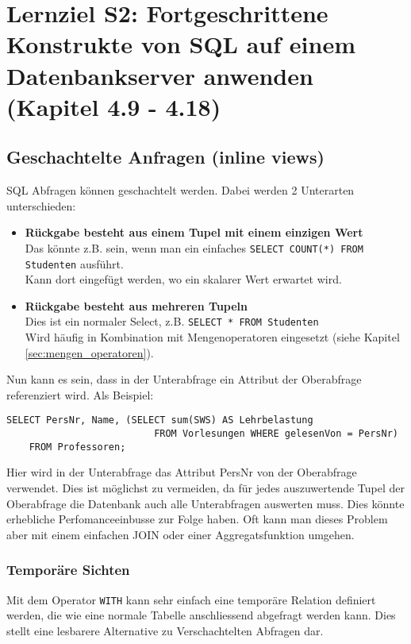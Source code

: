 \section{Lernziel S2: Fortgeschrittene Konstrukte von SQL auf einem Datenbankserver anwenden (Kapitel 4.9 - 4.18)}

\subsection{Geschachtelte Anfragen (inline views)}

SQL Abfragen können geschachtelt werden. Dabei werden 2 Unterarten unterschieden:

\begin{itemize}
  \item \textbf{Rückgabe besteht aus einem Tupel mit einem einzigen Wert} \\
  Das könnte z.B. sein, wenn man ein einfaches \texttt{SELECT COUNT(*) FROM Studenten} ausführt. \\
  Kann dort eingefügt werden, wo ein skalarer Wert erwartet wird.
  \item \textbf{Rückgabe besteht aus mehreren Tupeln} \\
  Dies ist ein normaler Select, z.B. \texttt{SELECT * FROM Studenten} \\
  Wird häufig in Kombination mit Mengenoperatoren eingesetzt (siehe Kapitel \ref{sec:mengen_operatoren}).
\end{itemize}

Nun kann es sein, dass in der Unterabfrage ein Attribut der Oberabfrage referenziert wird. Als Beispiel:

\begin{lstlisting}[caption={Korrelierte Unterabfrage},label=lst:unterabfrage_korreliert]
    SELECT PersNr, Name, (SELECT sum(SWS) AS Lehrbelastung 
                          FROM Vorlesungen WHERE gelesenVon = PersNr)
    FROM Professoren;
\end{lstlisting}

Hier wird in der Unterabfrage das Attribut PersNr von der Oberabfrage verwendet. Dies ist möglichst zu vermeiden, da für jedes auszuwertende Tupel der Oberabfrage die Datenbank auch alle Unterabfragen auswerten muss. Dies könnte erhebliche Perfomanceeinbusse zur Folge haben. Oft kann man dieses Problem aber mit einem einfachen JOIN oder einer Aggregatsfunktion umgehen.

\subsubsection{Temporäre Sichten}
Mit dem Operator \texttt{WITH} kann sehr einfach eine temporäre Relation definiert werden, die wie eine normale Tabelle anschliessend abgefragt werden kann. Dies stellt eine lesbarere Alternative zu Verschachtelten Abfragen dar.

